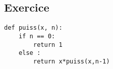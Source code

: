 \else
\fi


\subsection*{Exercice}


\begin{lstlisting}
def puiss(x, n):
    if n == 0:
        return 1
    else :
        return x*puiss(x,n-1)
\end{lstlisting}


